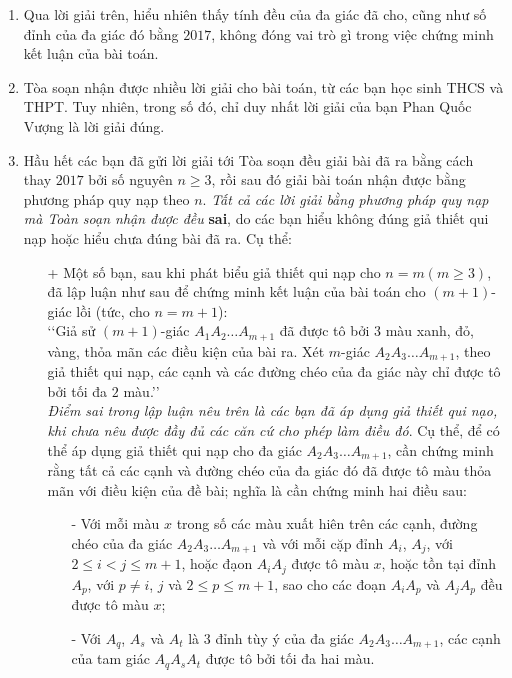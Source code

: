 \begin{bt}
{		\begin{nx}\hfill
			\begin{enumerate}
				\item Qua lời giải trên, hiểu nhiên thấy tính đều của đa giác đã cho, cũng như số đỉnh của đa giác đó bằng $2017$, không đóng vai trò gì trong việc chứng minh kết luận của bài toán.
				\item Tòa soạn nhận được nhiều lời giải cho bài toán, từ các bạn học sinh THCS và THPT. Tuy nhiên, trong số đó, chỉ duy nhất lời giải của bạn Phan Quốc Vượng là lời giải đúng.
				\item Hầu hết các bạn đã gửi lời giải tới Tòa soạn đều giải bài đã ra bằng cách thay $2017$ bởi số nguyên $n\ge 3$, rồi sau đó giải bài toán nhận được bằng phương pháp quy nạp theo $n$. \textit{Tất cả các lời giải bằng phương pháp quy nạp mà Toàn soạn nhận được đều} \textbf{sai}, do các bạn hiểu không đúng giả thiết qui nạp hoặc hiểu chưa đúng bài đã ra. Cụ thể:
				\begin{itemize}
					\item[+] Một số bạn, sau khi phát biểu giả thiết qui nạp cho $n=m(m\ge 3)$, đã lập luận như sau để chứng minh kết luận của bài toán cho $(m+1)$-giác lồi (tức, cho $n=m+1$):\\
					\lq\lq Giả sử $(m+1)$-giác $A_1A_2\ldots A_{m+1}$ đã được tô bởi $3$ màu xanh, đỏ, vàng, thỏa mãn các điều kiện của bài ra. Xét $m$-giác $A_2A_3\ldots A_{m+1}$, theo giả thiết qui nạp, các cạnh và các đường chéo của đa giác này chỉ được tô bởi tối đa $2$ màu.\rq\rq\\
					\textit{Điểm sai trong lập luận nêu trên là các bạn đã áp dụng giả thiết qui nạo, khi chưa nêu được đầy đủ các căn cứ cho phép làm điều đó}. Cụ thể, để có thể áp dụng giả thiết qui nạp cho đa giác $A_2A_3\ldots A_{m+1}$, cần chứng minh rằng tất cả các cạnh và đường chéo của đa giác đó đã được tô màu thỏa mãn với điều kiện của đề bài; nghĩa là cần chứng minh hai điều sau:
					\begin{itemize}
						\item[-] Với mỗi màu $x$ trong số các màu xuất hiên trên các cạnh, đường chéo của đa giác $A_2A_3\ldots A_{m+1}$ và với mỗi cặp đỉnh $A_i$, $A_j$, với $2\le i<j\le m+1$, hoặc đạon $A_iA_j$ được tô màu $x$, hoặc tồn tại đỉnh $A_p$, với $p\ne i$, $j$ và $2\le p\le m+1$, sao cho các đoạn $A_iA_p$ và $A_jA_p$ đều được tô màu $x$;
						\item[-] Với $A_q$, $A_s$ và $A_t$ là $3$ đỉnh tùy ý của đa giác $A_2A_3\ldots A_{m+1}$, các cạnh của tam giác $A_qA_sA_t$ được tô bởi tối đa hai màu.

\end{itemize}
\end{itemize}
\end{enumerate}
\end{nx}}
\end{bt}

